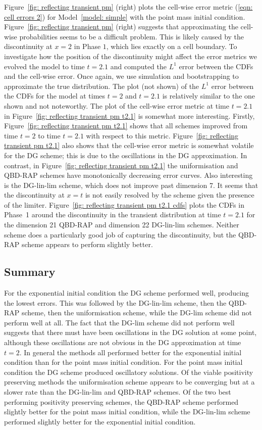 Figure~\ref{fig: reflecting transient pm} (right) plots the cell-wise error metric (\ref{eqn: cell errors 2}) for Model~\ref{model: simple} with the point mass initial condition. Figure~\ref{fig: reflecting transient pm} (right) suggests that approximating the cell-wise probabilities seems to be a difficult problem. This is likely caused by the discontinuity at \(x=2\) in Phase \(1\), which lies exactly on a cell boundary. To investigate how the position of the discontinuity might affect the error metrics we evolved the model to time \(t=2.1\) and computed the \(L^1\) error between the CDFs and the cell-wise error. Once again, we use simulation and bootstrapping to approximate the true distribution. The plot (not shown) of the \(L^1\) error between the CDFs for the model at times \(t=2\) and \(t=2.1\) is relatively similar to the one shown and not noteworthy. The plot of the cell-wise error metric at time \(t=2.1\) in Figure~\ref{fig: reflecting transient pm t2.1} is somewhat more interesting. Firstly, Figure~\ref{fig: reflecting transient pm t2.1} shows that all schemes improved from time \(t=2\) to time \(t=2.1\) with respect to this metric. Figure~\ref{fig: reflecting transient pm t2.1} also shows that the cell-wise error metric is somewhat volatile for the DG scheme; this is due to the oscillations in the DG approximation. In contrast, in Figure~\ref{fig: reflecting transient pm t2.1} the uniformisation and QBD-RAP schemes have monotonically decreasing error curves. Also interesting is the DG-lin-lim scheme, which does not improve past dimension 7. It seems that the discontinuity at \(x=t\) is not easily resolved by the scheme given the presence of the limiter. Figure~\ref{fig: reflecting transient pm t2.1 cdfs} plots the CDFs in Phase~1 around the discontinuity in the transient distribution at time \(t=2.1\) for the dimension 21 QBD-RAP and dimension 22 DG-lin-lim schemes. Neither scheme does a particularly good job of capturing the discontinuity, but the QBD-RAP scheme appears to perform slightly better. 


\subsection*{Summary}
For the exponential initial condition the DG scheme performed well, producing the lowest errors. This was followed by the DG-lin-lim scheme, then the QBD-RAP scheme, then the uniformisation scheme, while the DG-lim scheme did not perform well at all. The fact that the DG-lim scheme did not perform well suggests that there must have been oscillations in the DG solution at some point, although these oscillations are not obvious in the DG approximation at time \(t=2\). In general the methods all performed better for the exponential initial condition than for the point mass initial condition. For the point mass initial condition the DG scheme produced oscillatory solutions. Of the viable positivity preserving methods the uniformisation scheme appears to be converging but at a slower rate than the DG-lin-lim and QBD-RAP schemes. Of the two best performing positivity preserving schemes, the QBD-RAP scheme performed slightly better for the point mass initial condition, while the DG-lin-lim scheme performed slightly better for the exponential initial condition. 

